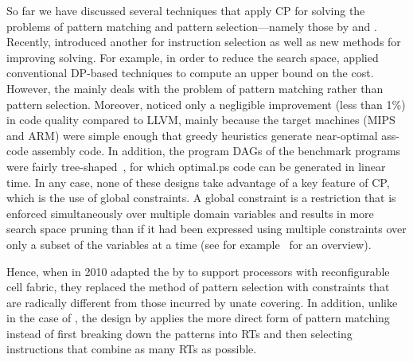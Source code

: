 So far we have discussed several techniques that apply \glsdesc{CP} for solving
the problems of \gls{pattern matching} and \gls{pattern selection}---namely
those by \citeauthor{Bashford1999} and \citeauthor{Martin2009}.
%
Recently,
\textcite{Beg2013} introduced another \tCPmodel for \gls{instruction selection}
as well as new methods for improving solving.
%
For example, in order to reduce
the search space, \citeauthor{Beg2013} applied conventional \gls{DP}-based
techniques to compute an upper bound on the cost.
%
However, the \tCPmodel mainly
deals with the problem of \gls{pattern matching} rather than \gls{pattern
  selection}.
%
Moreover, \citeauthor{Beg2013} noticed only a negligible
improvement (less than 1\%) in code quality compared to \gls{LLVM}, mainly
because the \glspl{target machine} (\gls{MIPS} and \gls{ARM}) were simple enough
that greedy heuristics generate near-\gls{optimal ass-code} \gls{assembly code}.
In addition, the \glspl{program DAG} of the benchmark \glspl{program} were
fairly \gls{tree}-shaped~\cite{VanBeek2014}, for which \gls{optimal.ps}
code can be generated in linear time.
%
In any case, none of these designs take
advantage of a key feature of \glsdesc{CP}, which is the use of \glspl{global
  constraint}.
%
A \gls{global constraint} is a restriction that is enforced
simultaneously over multiple \glspl{domain variable} and results in more search
space pruning than if it had been expressed using multiple constraints over only
a subset of the variables at a time (see for example~\cite{Beldiceanu2014} for
an overview).

Hence, when \textcite{Floch2010} in 2010 adapted the \tCPmodel by
\citeauthor{Martin2009} to support processors with reconfigurable cell fabric,
they replaced the method of \gls{pattern selection} with constraints that are
radically different from those incurred by \gls{unate covering}.
%
In addition,
unlike in the case of \citeauthor{Bashford1999}, the design by
\citeauthor{Floch2010} applies the more direct form of \gls{pattern matching}
instead of first breaking down the \glspl{pattern} into \glspl{RT} and then
selecting \glspl{instruction} that combine as many \glspl{RT} as possible.

